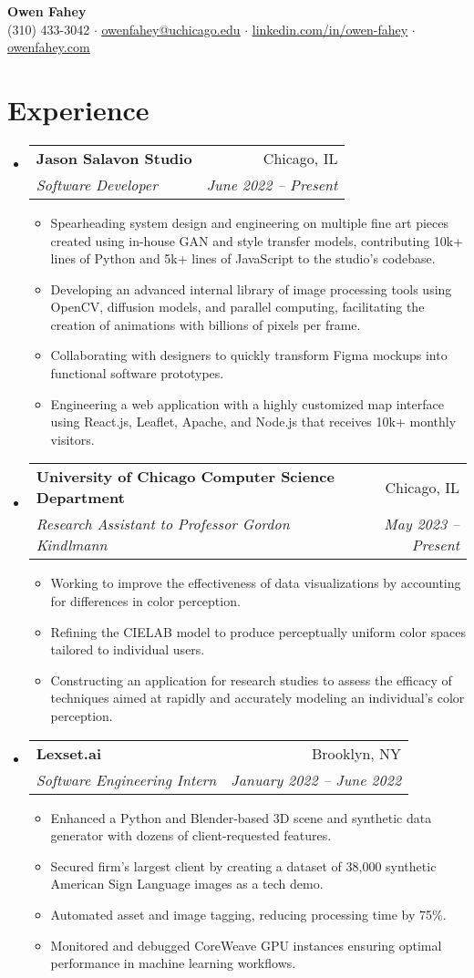\documentclass[letterpaper,11pt]{article}
\makeatletter
\newcommand{\resumeItem}[1]{
  \item\small{
    {#1 \vspace{-2pt}}
  }
}
\newcommand{\resumeSubheading}[4]{
  \vspace{-2pt}\item
    \begin{tabular*}{0.97\textwidth}[t]{l@{\extracolsep{\fill}}r}
      \textbf{#1} & #2 \\
      \textit{\small#3} & \textit{\small #4} \\
    \end{tabular*}\vspace{-7pt}
}
\newcommand{\resumeSubHeadingListStart}{\begin{itemize}[leftmargin=0.125in, label={}]}
\newcommand{\resumeSubHeadingListEnd}{\end{itemize}}
\newcommand{\resumeItemListStart}{\begin{itemize}[leftmargin=0.185in]
}
\newcommand{\resumeItemListEnd}{\end{itemize}\vspace{-5pt}}
\makeatother
\begin{document}
\begin{center}

  \textbf{\Huge 
Owen Fahey} \\
  \small (310) 433-3042 $\cdot$
  \href{mailto:owenfahey@uchicago.edu}{\underline{owenfahey@uchicago.edu}} $\cdot$
  \href{https://www.linkedin.com/in/owen-fahey}{\underline{linkedin.com/in/owen-fahey}} $\cdot$
  \href{https://owenfahey.com}{\underline{owenfahey.com}}
\end{center}

  
\section{Experience}
  \resumeSubHeadingListStart
    \resumeSubheading
      {Jason Salavon Studio}
      {Chicago, IL}
      {Software Developer}
      {June 2022 -- Present}
      \resumeItemListStart
        \resumeItem{Spearheading system design and engineering on multiple fine art pieces created using in-house GAN and style transfer models, contributing 10k+ lines of Python and 5k+ lines of JavaScript to the studio's codebase.}
        \resumeItem{Developing an advanced internal library of image processing tools using OpenCV, diffusion models, and parallel computing, facilitating the creation of animations with billions of pixels per frame.}
        \resumeItem{Collaborating with designers to quickly transform Figma mockups into functional software prototypes.}
        \resumeItem{Engineering a web application with a highly customized map interface using React.js, Leaflet, Apache, and Node.js that receives 10k+  monthly visitors.}
      \resumeItemListEnd
    \resumeSubheading
      {University of Chicago Computer Science Department}
      {Chicago, IL}
      {Research Assistant to Professor Gordon Kindlmann}
      {May 2023 -- Present}
      \resumeItemListStart
        \resumeItem{Working to improve the effectiveness of data visualizations by accounting for differences in color perception.}
        \resumeItem{Refining the CIELAB model to produce perceptually uniform color spaces tailored to individual users.}
        \resumeItem{Constructing an application for research studies to assess the efficacy of techniques aimed at rapidly and accurately modeling an individual's color perception.}
      \resumeItemListEnd
    \resumeSubheading
      {Lexset.ai}
      {Brooklyn, NY}
      {Software Engineering Intern}
      {January 2022 -- June 2022}
      \resumeItemListStart
        \resumeItem{Enhanced a Python and Blender-based 3D scene and synthetic data generator with dozens of client-requested features.}\resumeItem{Secured firm's largest client by creating a dataset of 38,000 synthetic American Sign Language images as a tech demo.}
        \resumeItem{Automated asset and image tagging, reducing processing time by 75\%.}
        \resumeItem{Monitored and debugged CoreWeave GPU instances ensuring optimal performance in machine learning workflows. }
      \resumeItemListEnd
  \resumeSubHeadingListEnd
\end{document}
